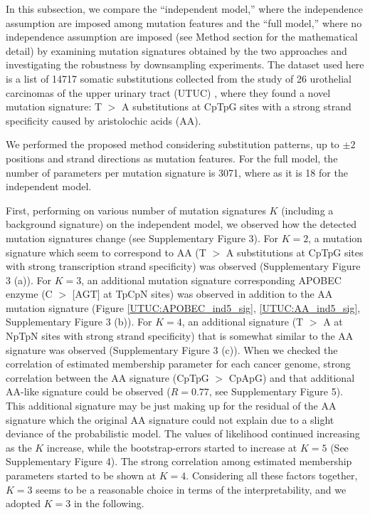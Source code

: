 In this subsection, we compare  the ``independent model,'' where the independence assumption are imposed among mutation features
and the ``full model,'' where no independence assumption are imposed (see Method section for the mathematical detail)
by examining mutation signatures obtained by the two approaches and investigating the robustness by downsampling experiments.
The dataset used here is a list of 14717 somatic substitutions 
collected from the study of 26 urothelial carcinomas of the upper urinary tract (UTUC) \cite{pmid23926200},
where they found a novel mutation signature: 
T $>$ A substitutions at CpTpG sites with a strong strand specificity caused by aristolochic acids (AA).

We performed the proposed method considering substitution patterns, up to $\pm 2$ positions and strand directions as mutation features.
For the full model, the number of parameters per mutation signature is 3071, where as it is 18 for the independent model.

First, performing on various number of mutation signatures $K$ (including a background signature) on the independent model, 
we observed how the detected mutation signatures change (see Supplementary Figure 3).
For $K = 2$, a mutation signature which seem to correspond to AA  (T $>$ A substitutions at CpTpG sites with strong transcription strand specificity) was observed (Supplementary Figure 3 (a)).
For $K = 3$, an additional mutation signature corresponding APOBEC enzyme (C $>$ [AGT] at TpCpN sites) was observed
in addition to the AA mutation signature (Figure \ref{UTUC:APOBEC_ind5_sig}, \ref{UTUC:AA_ind5_sig}, Supplementary Figure 3 (b)).
For $K = 4$, an additional signature (T $>$ A at NpTpN sites with strong strand specificity) 
that is somewhat similar to the AA signature was observed (Supplementary Figure 3 (c)). 
When we checked the correlation of estimated membership parameter for each cancer genome, 
strong correlation between the AA signature (CpTpG $>$ CpApG) and that additional AA-like signature could be observed ($R = 0.77$, see Supplementary Figure 5). 
This additional signature may be just making up for the residual of the AA signature 
which the original AA signature could not explain due to a slight deviance of the probabilistic model.
The values of likelihood continued increasing as the $K$ increase, while the bootstrap-errors started to increase at $K = 5$ (See Supplementary Figure 4).
The strong correlation among estimated membership parameters started to be shown at $K = 4$.
Considering all these factors together, $K = 3$ seems to be a reasonable choice in terms of the interpretability,
and we adopted $K = 3$ in the following.


